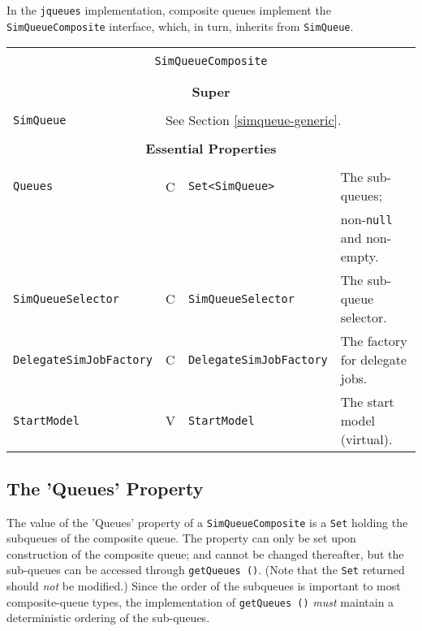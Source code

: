 In the \lstinline|jqueues| implementation,
  composite queues implement the \lstinline|SimQueueComposite| interface,
  which, in turn, inherits from \lstinline|SimQueue|.

\begin{tabular}{|l|l|l|l|}
	\hline
	\multicolumn{4}{|c|}{} \\
	\multicolumn{4}{|c|}{\lstinline[basicstyle=\large]{SimQueueComposite}} \\
	\multicolumn{4}{|c|}{} \\
	\hline
	\multicolumn{4}{|c|}{} \\
	\multicolumn{4}{|c|}{\bf Super} \\
	\multicolumn{4}{|c|}{} \\
	\hline
	\lstinline|SimQueue| & \multicolumn{3}{|l|}{See Section \ref{simqueue-generic}.} \\
	\hline
	\multicolumn{4}{|c|}{} \\
	\multicolumn{4}{|c|}{\bf Essential Properties} \\
	\multicolumn{4}{|c|}{} \\
	\hline
	\lstinline|Queues| & C & \lstinline|Set<SimQueue>| & The sub-queues; \\
	& & & non-\lstinline|null| and non-empty. \\
	\hline
	\lstinline|SimQueueSelector| & C & \lstinline|SimQueueSelector| & The sub-queue selector. \\
	\hline
	\lstinline|DelegateSimJobFactory| & C & \lstinline|DelegateSimJobFactory| & The factory for delegate jobs. \\
	\hline
	\lstinline|StartModel| & V & \lstinline|StartModel| & The start model (virtual). \\
	\hline
\end{tabular}

\subsection{The 'Queues' Property}
\label{sec:simqueuecomposite-queues}

The value of the 'Queues' property of a \lstinline|SimQueueComposite|
  is a \lstinline|Set| holding the subqueues of the composite queue.
The property can only be set upon construction of the composite queue;
  and cannot be changed thereafter,
  but the sub-queues can be accessed through \lstinline|getQueues ()|.
(Note that the \lstinline|Set| returned should {\em not\/} be modified.)
Since the order of the subqueues is important to most composite-queue types,
  the implementation of \lstinline|getQueues ()| {\em must\/} maintain
  a deterministic ordering of the sub-queues.
  
